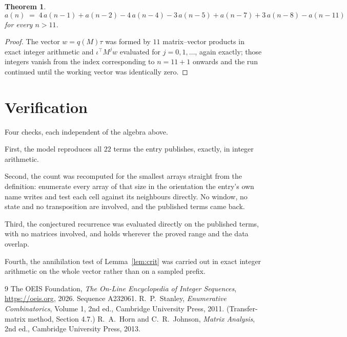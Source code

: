 \documentclass[11pt,a4paper]{article}
\theoremstyle{plain}
\newtheorem{theorem}{Theorem}
\theoremstyle{definition}
\begin{document}
\begin{theorem}
\[
a(n)\;=\;4\,a(n-1) + a(n-2) - 4\,a(n-4) - 3\,a(n-5) + a(n-7) + 3\,a(n-8) - a(n-11)
\]
for every $n>11$.
\end{theorem}

\begin{proof}
The vector $w=q(M)\tau$ was formed by $11$ matrix--vector products in exact integer
arithmetic and $\iota^{\!\top}M^{j}w$ evaluated for $j=0,1,\dots$, again exactly; those
integers vanish from the index corresponding to $n=11+1$ onwards and the run continued
until the working vector was identically zero.
\end{proof}

\section{Verification}

Four checks, each independent of the algebra above.

First, the model reproduces all $22$ terms the entry publishes, exactly, in integer
arithmetic.

Second, the count was recomputed for the smallest arrays straight from the definition:
enumerate every array of that size in the orientation the entry's own name writes and test each
cell against its neighbours directly. No window, no state and no transposition are involved,
and the published terms came back.

Third, the conjectured recurrence was evaluated directly on the published terms, with no
matrices involved, and holds wherever the proved range and the data overlap.

Fourth, the annihilation test of Lemma~\ref{lem:crit} was carried out in exact integer
arithmetic on the whole vector rather than on a sampled prefix.

\begin{thebibliography}{9}
 The OEIS Foundation, \emph{The On-Line Encyclopedia of Integer
Sequences}, \url{https://oeis.org}, 2026. Sequence A232061.
 R.~P.~Stanley, \emph{Enumerative Combinatorics}, Volume 1, 2nd ed.,
Cambridge University Press, 2011. (Transfer-matrix method, Section 4.7.)
 R.~A.~Horn and C.~R.~Johnson, \emph{Matrix Analysis}, 2nd ed., Cambridge
University Press, 2013.
\end{thebibliography}
\end{document}
